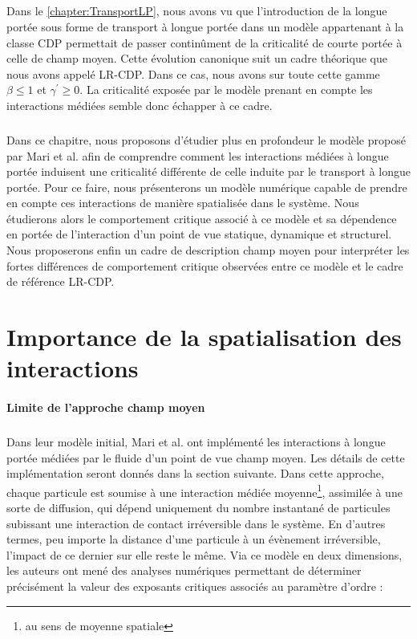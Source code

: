 \subparagraph{}Dans le \autoref{chapter:TransportLP}, nous avons vu que l'introduction de la longue portée sous forme de transport à longue portée dans un modèle appartenant à la classe CDP permettait de passer continûment de la criticalité de courte portée à celle de champ moyen. Cette évolution canonique suit un cadre théorique que nous avons appelé LR-CDP. Dans ce cas, nous avons sur toute cette gamme $\beta \leq 1$ et $\gamma^\prime \geq 0$. La criticalité exposée par le modèle prenant en compte les interactions médiées semble donc échapper à ce cadre.

\subparagraph{}Dans ce chapitre, nous proposons d'étudier plus en profondeur le modèle proposé par Mari et al. \cite{mari_absorbing_2022} afin de comprendre comment les interactions médiées à longue portée induisent une criticalité différente de celle induite par le transport à longue portée. Pour ce faire, nous présenterons un modèle numérique capable de prendre en compte ces interactions de manière spatialisée dans le système. Nous étudierons alors le comportement critique associé à ce modèle et sa dépendence en portée de l'interaction d'un point de vue statique, dynamique et structurel. Nous proposerons enfin un cadre de description champ moyen pour interpréter les fortes différences de comportement critique observées entre ce modèle et le cadre de référence LR-CDP.

\section{Importance de la spatialisation des interactions}

\paragraph{Limite de l'approche champ moyen}

\subparagraph{}Dans leur modèle initial, Mari et al. \cite{mari_absorbing_2022} ont implémenté les interactions à longue portée médiées par le fluide d'un point de vue champ moyen. Les détails de cette implémentation seront donnés dans la section suivante. Dans cette approche, chaque particule est soumise à une interaction médiée moyenne\footnote{au sens de moyenne spatiale}, assimilée à une sorte de diffusion, qui dépend uniquement du nombre instantané de particules subissant une interaction de contact irréversible dans le système. En d'autres termes, peu importe la distance d'une particule à un évènement irréversible, l'impact de ce dernier sur elle reste le même. Via ce modèle en deux dimensions, les auteurs ont mené des analyses numériques permettant de déterminer précisément la valeur des exposants critiques associés au paramètre d'ordre :

